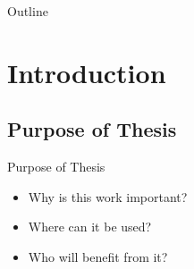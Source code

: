 \documentclass[xcolor={table}]{beamer}
\title[Thesis presentation]{\thetitle} %
\author{André Danielsson} %
\institute[KTH] %
{%
\textit{anddani@kth.se}\\ %
\medskip
Royal Institute of Technology\\
Computer Science and Communication\\ %
}
\date{\today} %
\begin{document}


\begin{frame}
\titlepage%
\end{frame}

\begin{frame}{Outline}
\end{frame}

\section{Introduction}
\subsection{Purpose of Thesis}
\begin{frame}{Purpose of Thesis}
    \begin{itemize}
        \item<1-> Why is this work important?
        \item<2-> Where can it be used?
        \item<3-> Who will benefit from it?
    \end{itemize}
\end{frame}
\end{document}
